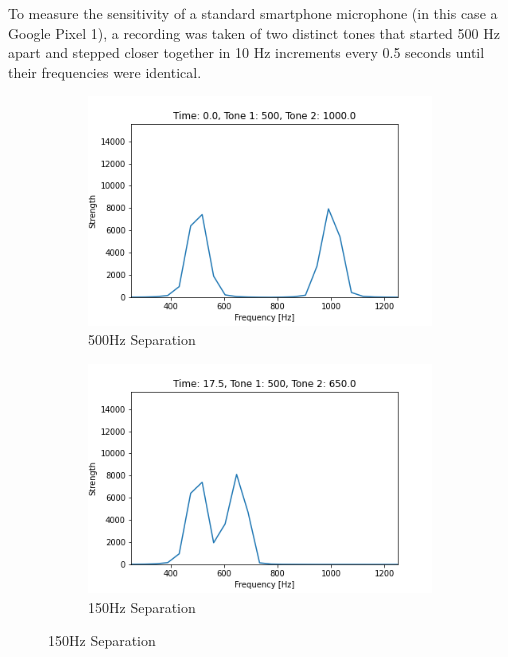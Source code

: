 To measure the sensitivity of a standard smartphone microphone (in this case a Google Pixel 1), a recording was taken of two distinct tones that started 500 Hz apart and stepped closer together in 10 Hz increments every 0.5 seconds until their frequencies were identical.

\begin{figure}[h]
    \centering
    \begin{subfigure}{0.33\textwidth}
        \centering
        \includegraphics[width=.90\linewidth]{Figures/4 Protocol Design/Tone Distinctiveness/0.06.png}
        \caption{500Hz Separation}
        \label{fig:tone-sep-500}
    \end{subfigure}%
    \begin{subfigure}{0.33\textwidth}
        \centering
        \includegraphics[width=.90\linewidth]{Figures/4 Protocol Design/Tone Distinctiveness/17.53.png}
        \caption{150Hz Separation}
        \label{fig:tone-sep-150}
    \end{subfigure}%

\end{figure}
